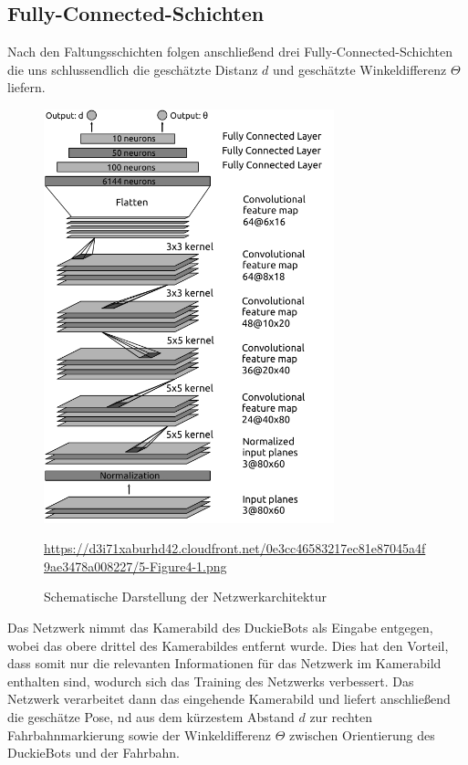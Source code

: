 \subsection{Fully-Connected-Schichten}

Nach den Faltungsschichten folgen anschließend drei Fully-Connected-Schichten die uns schlussendlich die geschätzte Distanz $d$ und geschätzte Winkeldifferenz $\Theta$ liefern.
\vspace{0.6cm}
\begin{figure}[H]
	\centering
	\includegraphics[width=0.75\textwidth]{kapitel4/images/network_architecture.png}
	\caption{Schematische Darstellung der Netzwerkarchitektur}
	\label{network-architecture}
	\vspace{0.2cm}
	\quelle\url{https://d3i71xaburhd42.cloudfront.net/0e3cc46583217ec81e87045a4f9ae3478a008227/5-Figure4-1.png}
\end{figure}

Das Netzwerk nimmt das  Kamerabild des DuckieBots als Eingabe entgegen, wobei das obere drittel des Kamerabildes entfernt wurde. Dies hat den Vorteil, dass somit nur die relevanten Informationen für das Netzwerk im Kamerabild enthalten sind, wodurch sich das Training des Netzwerks verbessert. Das Netzwerk verarbeitet dann das eingehende Kamerabild und liefert anschließend die geschätze Pose, nd aus dem kürzestem Abstand $d$ zur rechten Fahrbahnmarkierung sowie der Winkeldifferenz $\Theta$ zwischen Orientierung des DuckieBots und der Fahrbahn.


